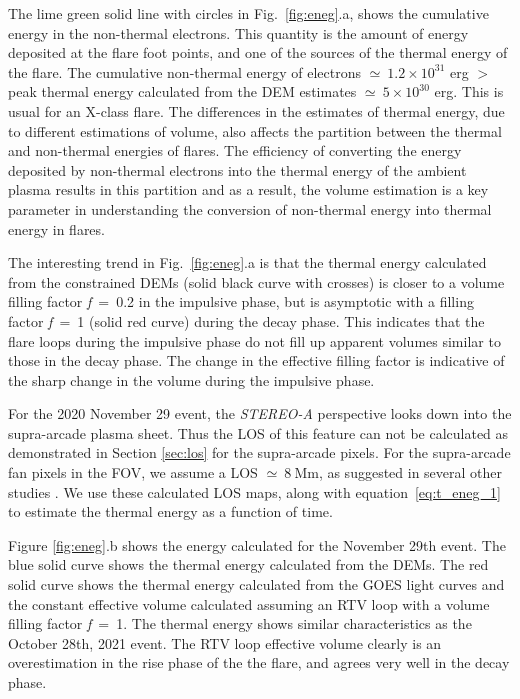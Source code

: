 The lime green solid line with circles in Fig.~\ref{fig:eneg}.a, shows the cumulative energy in the non-thermal electrons. This quantity is the amount of energy deposited at the flare foot points, and one of the sources of the thermal energy of the flare. The cumulative non-thermal energy of electrons $\simeq~1.2\times 10^{31}$ erg $>$ peak thermal energy calculated from the DEM estimates $\simeq~5\times 10^{30}$ erg. This is usual for an X-class flare. The differences in the estimates of thermal energy, due to different estimations of volume, also affects the partition between the thermal and non-thermal energies of flares. The efficiency of converting the energy deposited by non-thermal electrons into the thermal energy of the ambient plasma results in this partition and as a result, the volume estimation is a key parameter in understanding the conversion of non-thermal energy into thermal energy in flares.

The interesting trend in Fig.~\ref{fig:eneg}.a is that the thermal energy calculated from the constrained DEMs (solid black curve with crosses) is closer to a volume filling factor \textit{f}~=~0.2 in the impulsive phase, but is asymptotic with a filling factor \textit{f}~=~1 (solid red curve) during the decay phase. This indicates that the flare loops during the impulsive phase do not fill up apparent volumes similar to those in the decay phase. The change in the effective filling factor is indicative of the sharp change in the volume during the impulsive phase.

For the 2020 November 29 event, the {\it STEREO-A} perspective looks down into the supra-arcade plasma sheet. Thus the LOS of this feature can not be calculated as demonstrated in Section \ref{sec:los} for the supra-arcade pixels. For the supra-arcade fan pixels in the FOV, we assume a LOS $\simeq~8~\textrm{Mm}$, as suggested in several other studies \citep[see e.g.,][]{savage10,seaton17,li18}. We use these calculated LOS maps, along with equation~\ref{eq:t_eneg_1} to estimate the thermal energy as a function of time.

Figure \ref{fig:eneg}.b shows the energy calculated for the November 29th event. The blue solid curve shows the thermal energy calculated from the DEMs. The red solid curve shows the thermal energy calculated from the GOES light curves and the constant effective volume calculated assuming an RTV loop with a volume filling factor \textit{f}~=~1. The thermal energy shows similar characteristics as the October 28th, 2021 event. The RTV loop effective volume clearly is an overestimation in the rise phase of the the flare, and agrees very well in the decay phase.

